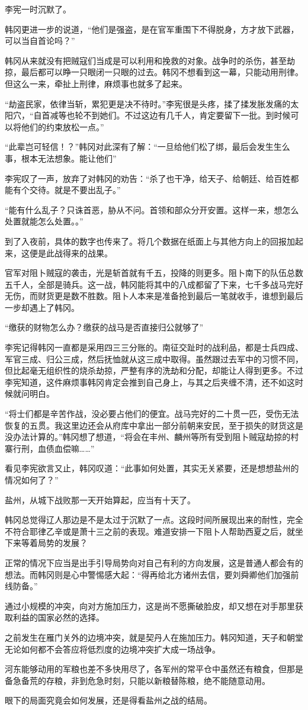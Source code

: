 李宪一时沉默了。

韩冈更进一步的说道，“他们是强盗，是在官军重围下不得脱身，方才放下武器，可以当自首论吗？”

韩冈从来就没有把贼寇们当成是可以利用和挽救的对象。战争时的杀伤，甚至劫掠，最后都可以睁一只眼闭一只眼的过去。韩冈不想看到这一幕，只能动用刑律。但这么一来，牵扯上刑律，麻烦事也就多了起来。

“劫盗民家，依律当斩，累犯更是决不待时。”李宪很是头疼，揉了揉发胀发痛的太阳穴，“自首减等也轮不到她们。不过这边有几千人，肯定要留下一批。到时候可以将他们的约束放松一点。”

“此辈岂可轻信！？”韩冈对此深有了解：“一旦给他们松了绑，最后会发生生么事，根本无法想象。能让他们”

李宪叹了一声，放弃了对韩冈的劝告：“杀了也干净，给天子、给朝廷、给百姓都能有个交待。就是不要出乱子。”

“能有什么乱子？只诛首恶，胁从不问。首领和部众分开安置。这样一来，想怎么处置就能怎么处置。。”

到了入夜前，具体的数字也传来了。将几个数据在纸面上与其他方向上的回报加起来，这便是此战得来的战果。

官军对阻卜贼寇的袭击，光是斩首就有千五，投降的则更多。阻卜南下的队伍总数五千人，全部是骑兵。这一战，韩冈能将其中的八成都留了下来，七千多战马完好无伤，而财货更是数不胜数。阻卜人本来是准备抢到最后一笔就收手，谁想到最后一步却遇上了韩冈。

“缴获的财物怎么办？缴获的战马是否直接归公就够了”

李宪记得韩冈一直都是采用四三三分账的。南征交趾时的战利品，都是士兵四成、军官三成、归公三成，然后抚恤就从这三成中取得。虽然跟过去军中的习惯不同，但比起毫无组织性的烧杀劫掠，严整有序的洗劫和分配，却能让人得到更多。不过李宪知道，这件麻烦事韩冈肯定会推到自己身上，与其之后夹缠不清，还不如这时候就问明白。

“将士们都是辛苦作战，没必要占他们的便宜。战马完好的二十贯一匹，受伤无法恢复的五贯。我这里边还会从府库中拿出一部分前朝来安民，至于损失的财货这是没办法计算的。”韩冈想了想道，“将会在丰州、麟州等所有受到阻卜贼寇劫掠的村寨行刑，血债血偿嘛……”

看见李宪欲言又止，韩冈叹道：“此事如何处置，其实无关紧要，还是想想盐州的情况如何了？”

盐州，从城下战败那一天开始算起，应当有十天了。

韩冈总觉得辽人那边是不是太过于沉默了一点。这段时间所展现出来的耐性，完全不符合耶律乙辛或是萧十三之前的表现。难道安排一下阻卜人帮助西夏之后，就坐下来等着局势的发展？

正常的情况下应当是出手引导局势向对自己有利的方向发展，这是普通人都会有的想法。而韩冈则是心中警惕感大起：“得再给北方诸州去信，要刘舜卿他们加强前线防备。”

通过小规模的冲突，向对方施加压力，这是尚不愿撕破脸皮，却又想在对手那里获取利益的国家必然的选择。

之前发生在雁门关外的边境冲突，就是契丹人在施加压力。韩冈知道，天子和朝堂无论如何都不会答应将低烈度的边境冲突扩大成一场战争。

河东能够动用的军粮也差不多快用尽了，各军州的常平仓中虽然还有粮食，但那是备急备荒的存粮，非到危急时刻，只能以新粮替陈粮，绝不能随意动用。

眼下的局面究竟会如何发展，还是得看盐州之战的结局。

